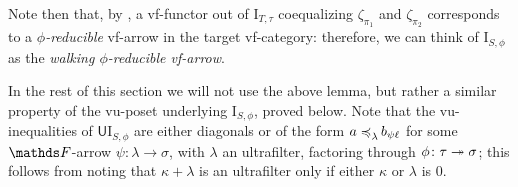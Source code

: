 \begin{rmk}\label{rmk:walking-phi-reduc}
    Note then that, by , a vf-functor out of $\mathrm I_{T,\tau}$ coequalizing $\zeta_{\pi_1}$ and $\zeta_{\pi_2}$ corresponds to a \emph{$\phi$-reducible} vf-arrow in the target vf-category: therefore, we can think of $\mathrm I_{S,\phi}$ as the \emph{walking $\phi$-reducible vf-arrow}. 
\end{rmk}

In the rest of this section we will not use the above lemma, but rather a similar property of the vu-poset underlying $\mathrm I_{S,\phi}$, proved below.
%
Note that the vu-inequalities of $\mathsf U \mathrm I_{S,\phi}$ are either diagonals or of the form $a\mathrel{\preccurlyeq_{{\lambda}}^{{}}\mkern-2mu}b_{\psi \ell}$ for some $\FF$-arrow $\psi\colon\lambda\to\sigma$, with $\lambda$ an ultrafilter, factoring through $\phi\colon\tau\twoheadrightarrow\sigma$; this follows from  noting that $\kappa + \lambda$ is an ultrafilter only if either $\kappa$ or $\lambda$ is $0$. 

